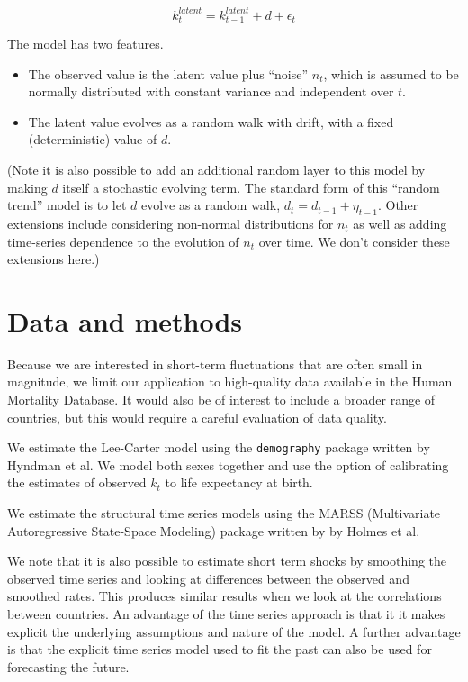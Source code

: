 \documentclass[12pt]{article}
\begin{document}
\begin{equation}
  k_t^{latent} = k_{t-1}^{latent} + d + \epsilon_t
\end{equation}

The model has two features.
\begin{itemize}
  \item The observed value is the latent value plus ``noise'' $n_t$,
    which is assumed to be normally distributed with constant variance
    and independent over $t$.

  \item The latent value evolves as a random walk with drift, with a
    fixed (deterministic) value of $d$.
\end{itemize}

(Note it is also possible to add an additional random layer to this
model by making $d$ itself a stochastic evolving term. The standard
form of this ``random trend'' model is to let $d$ evolve as a random
walk, $d_t = d_{t-1} + \eta_{t-1}$.  Other extensions include
considering non-normal distributions for $n_t$ as well as adding
time-series dependence to the evolution of $n_t$ over time. We don't
consider these extensions here.)

\section{Data and methods}

Because we are interested in short-term fluctuations that are often
small in magnitude, we limit our application to high-quality
data available in the Human Mortality Database. It would also be of
interest to include a broader range of countries, but this would
require a careful evaluation of data quality.

We estimate the Lee-Carter model using the {\tt demography} package
written by Hyndman et al. We model both sexes together and use the
option of calibrating the estimates of observed $k_t$ to life
expectancy at birth.

We estimate the structural time series models using the MARSS
(Multivariate Autoregressive State-Space Modeling)  package
written by by Holmes et al. 

We note that it is also possible to estimate short term shocks by
smoothing the observed time series and looking at differences between
the observed and smoothed rates. This produces similar results when we
look at the correlations between countries. An advantage of the time
series approach is that it it makes explicit the underlying
assumptions and nature of the model. A further advantage is that the
explicit time series model used to fit the past can also be used for
forecasting the future.
\end{document}
